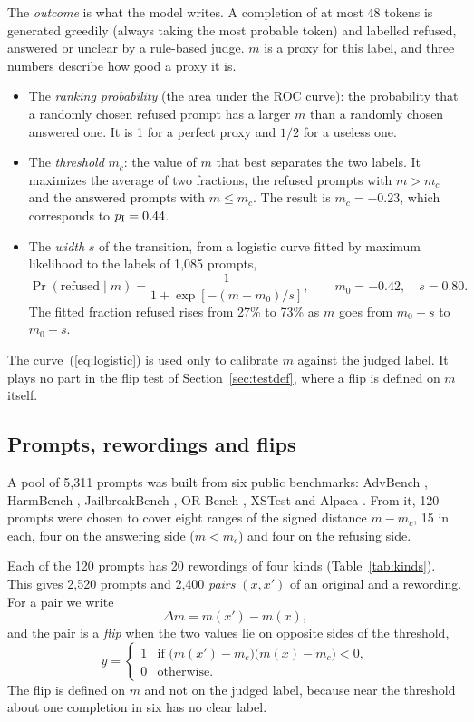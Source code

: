 \documentclass[11pt]{article}
\newcommand{\mc}{m_c}
\newcommand{\Dm}{\Delta m}
\begin{document}
The \emph{outcome} is what the model writes. A completion of at most 48 tokens is generated greedily (always taking the most probable token) and labelled refused, answered or unclear by a rule-based judge. $m$ is a proxy for this label, and three numbers describe how good a proxy it is.
\begin{itemize}
\item The \emph{ranking probability} (the area under the ROC curve): the probability that a randomly chosen refused prompt has a larger $m$ than a randomly chosen answered one. It is 1 for a perfect proxy and $1/2$ for a useless one.
\item The \emph{threshold} $\mc$: the value of $m$ that best separates the two labels. It maximizes the average of two fractions, the refused prompts with $m>\mc$ and the answered prompts with $m\le\mc$. The result is $\mc=-0.23$, which corresponds to $p_{\rm I}=0.44$.
\item The \emph{width} $s$ of the transition, from a logistic curve fitted by maximum likelihood to the labels of 1{,}085 prompts,
\begin{equation}
\Pr(\text{refused}\mid m)=\frac{1}{1+\exp[-(m-m_0)/s]},\qquad m_0=-0.42,\quad s=0.80 .
\label{eq:logistic}
\end{equation}
The fitted fraction refused rises from 27\% to 73\% as $m$ goes from $m_0-s$ to $m_0+s$.
\end{itemize}
The curve~(\ref{eq:logistic}) is used only to calibrate $m$ against the judged label. It plays no part in the flip test of Section~\ref{sec:testdef}, where a flip is defined on $m$ itself.

\subsection{Prompts, rewordings and flips}
\label{sec:prompts}

A pool of 5{,}311 prompts was built from six public benchmarks: AdvBench \cite{advbench}, HarmBench \cite{harmbench}, JailbreakBench \cite{jbb}, OR-Bench \cite{orbench}, XSTest \cite{xstest} and Alpaca \cite{alpaca}. From it, 120 prompts were chosen to cover eight ranges of the signed distance $m-\mc$, 15 in each, four on the answering side ($m<\mc$) and four on the refusing side.

Each of the 120 prompts has 20 rewordings of four kinds (Table~\ref{tab:kinds}). This gives 2{,}520 prompts and 2{,}400 \emph{pairs} $(x,x')$ of an original and a rewording. For a pair we write
\begin{equation}
\Dm=m(x')-m(x),
\end{equation}
and the pair is a \emph{flip} when the two values lie on opposite sides of the threshold,
\begin{equation}
y=\begin{cases}1 & \text{if } \bigl(m(x')-\mc\bigr)\bigl(m(x)-\mc\bigr)<0,\\ 0 & \text{otherwise.}\end{cases}
\label{eq:flip}
\end{equation}
The flip is defined on $m$ and not on the judged label, because near the threshold about one completion in six has no clear label.
\end{document}

